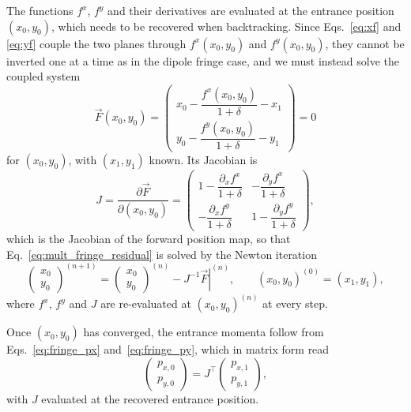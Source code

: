 The functions $f^x$, $f^y$ and their derivatives are evaluated at the entrance position
$(x_0, y_0)$, which needs to be recovered when backtracking. Since Eqs.~\eqref{eq:xf} and \eqref{eq:yf}
couple the two planes through $f^x(x_0,y_0)$ and $f^y(x_0,y_0)$, they cannot be inverted one at a time as
in the dipole fringe case, and we must instead solve the coupled system
\begin{equation}
\vec{F}(x_0, y_0) =
\begin{pmatrix}
x_0 - \dfrac{f^x(x_0,y_0)}{1+\delta} - x_1 \\[1.5ex]
y_0 - \dfrac{f^y(x_0,y_0)}{1+\delta} - y_1
\end{pmatrix}
= 0
\label{eq:mult_fringe_residual}
\end{equation}
for $(x_0, y_0)$, with $(x_1, y_1)$ known. Its Jacobian is
\begin{equation}
J = \frac{\partial \vec{F}}{\partial (x_0, y_0)} =
\begin{pmatrix}
1 - \dfrac{\partial_x f^x}{1+\delta} & -\dfrac{\partial_y f^x}{1+\delta} \\[1.5ex]
-\dfrac{\partial_x f^y}{1+\delta} & 1 - \dfrac{\partial_y f^y}{1+\delta}
\end{pmatrix},
\label{eq:mult_fringe_jacobian}
\end{equation}
which is the Jacobian of the forward position map, so that Eq.~\eqref{eq:mult_fringe_residual}
is solved by the Newton iteration
\begin{equation}
\begin{pmatrix} x_0 \\ y_0 \end{pmatrix}^{(n+1)}
=
\begin{pmatrix} x_0 \\ y_0 \end{pmatrix}^{(n)}
- \left. J^{-1} \vec{F} \right|^{(n)},
\qquad
(x_0, y_0)^{(0)} = (x_1, y_1),
\end{equation}
where $f^x$, $f^y$ and $J$ are re-evaluated at $(x_0, y_0)^{(n)}$ at every step.

Once $(x_0, y_0)$ has converged, the entrance momenta follow from Eqs.~\eqref{eq:fringe_px}
and~\eqref{eq:fringe_py}, which in matrix form read
\begin{equation}
\begin{pmatrix} p_{x,0} \\ p_{y,0} \end{pmatrix}
= J^\top
\begin{pmatrix} p_{x,1} \\ p_{y,1} \end{pmatrix},
\end{equation}
with $J$ evaluated at the recovered entrance position.

